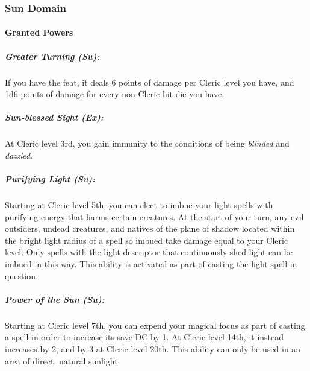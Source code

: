 \subsubsection{Sun Domain}
\paragraph{Granted Powers}
\subparagraph{Greater Turning (Su):} 
If you have the  feat, it deals 6 points of damage per Cleric level you have, and 1d6 points of damage for every non-Cleric hit die you have.
\subparagraph{Sun-blessed Sight (Ex):}
At Cleric level 3rd, you gain immunity to the conditions of being \emph{blinded} and \emph{dazzled}.
\subparagraph{Purifying Light (Su):}
Starting at Cleric level 5th, you can elect to imbue your light spells with purifying energy that harms certain creatures. At the start of your turn, any evil outsiders, undead creatures, and natives of the plane of shadow located within the bright light radius of a spell so imbued take damage equal to your Cleric level. Only spells with the light descriptor that continuously shed light can be imbued in this way. This ability is activated as part of casting the light spell in question.
\subparagraph{Power of the Sun (Su):}
Starting at Cleric level 7th, you can expend your magical focus as part of casting a spell in order to increase its save DC by 1.
At Cleric level 14th, it instead increases by 2, and by 3 at Cleric level 20th.
This ability can only be used in an area of direct, natural sunlight.
